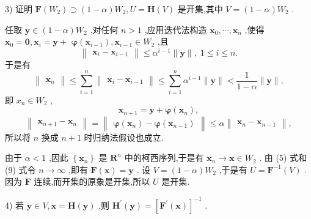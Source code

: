 3) 证明 \(\mathbf{F}\left( {W}_{2}\right)  \supset  \left( {1 - \alpha }\right) {W}_{2},U = \mathbf{H}\left( V\right)\) 是开集,其中 \(V = \left( {1 - \alpha }\right) {W}_{2}\) .

任取 \(\mathbf{y} \in  \left( {1 - \alpha }\right) {W}_{2}\) ,对任何 \(n > 1\) ,应用迭代法构造 \({\mathbf{x}}_{0},\cdots ,{\mathbf{x}}_{n}\) ,使得 \({\mathbf{x}}_{0} = \mathbf{0},{\mathbf{x}}_{i} = \mathbf{y} +\)  \(\mathbf{\varphi }\left( {\mathbf{x}}_{i - 1}\right) ,{\mathbf{x}}_{i - 1} \in  {W}_{2}\) ,且
\[
\begin{Vmatrix}{{\mathbf{x}}_{i} - {\mathbf{x}}_{i - 1}}\end{Vmatrix} \leq  {\alpha }^{i - 1}\parallel \mathbf{y}\parallel ,\;1 \leq  i \leq  n. \tag{8}
\]
于是有
\[
\begin{Vmatrix}{\mathbf{x}}_{n}\end{Vmatrix} \leq  \mathop{\sum }\limits_{{i = 1}}^{n}\begin{Vmatrix}{{\mathbf{x}}_{i} - {\mathbf{x}}_{i - 1}}\end{Vmatrix} \leq  \mathop{\sum }\limits_{{i = 1}}^{n}{\alpha }^{i - 1}\parallel \mathbf{y}\parallel  < \frac{1}{1 - \alpha }\parallel \mathbf{y}\parallel ,
\]
即 \({x}_{n} \in  {W}_{2}\) ,
\[
{\mathbf{x}}_{n + 1} = \mathbf{y} + \mathbf{\varphi }\left( {\mathbf{x}}_{n}\right) , \tag{9}
\]
\[
\begin{Vmatrix}{{\mathbf{x}}_{n + 1} - {\mathbf{x}}_{n}}\end{Vmatrix} = \begin{Vmatrix}{\mathbf{\varphi }\left( {\mathbf{x}}_{n}\right)  - \mathbf{\varphi }\left( {\mathbf{x}}_{n - 1}\right) }\end{Vmatrix} \leq  \alpha \begin{Vmatrix}{{\mathbf{x}}_{n} - {\mathbf{x}}_{n - 1}}\end{Vmatrix},
\]
所以将 \(n\) 换成 \(n + 1\) 时归纳法假设也成立.

由于 \(\alpha  < 1\) ,因此 \(\left\{  {\mathbf{x}}_{n}\right\}\) 是 \({\mathbf{R}}^{n}\) 中的柯西序列,于是有 \({\mathbf{x}}_{n} \rightarrow  \mathbf{x} \in  {W}_{2}\) . 由 (5) 式和 (9) 式令 \(n \rightarrow  \infty\) ,即有 \(\mathbf{F}\left( \mathbf{x}\right)  = \mathbf{y}\) . 设 \(V = \left( {1 - \alpha }\right) {W}_{2}\) ,于是有 \(U = {\mathbf{F}}^{-1}\left( V\right)\) . 因为 \(\mathbf{F}\) 连续,而开集的原象是开集,所以 \(U\) 是开集.

4) 若 \(\mathbf{y} \in  V,\mathbf{x} = \mathbf{H}\left( \mathbf{y}\right)\) ,则 \({\mathbf{H}}^{\prime }\left( \mathbf{y}\right)  = {\left\lbrack  {\mathbf{F}}^{\prime }\left( \mathbf{x}\right) \right\rbrack  }^{-1}\) .

